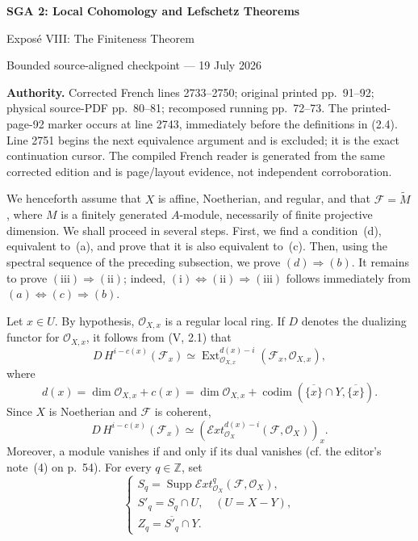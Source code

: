 \documentclass[10pt,a4paper]{article}
\newcommand{\cF}{\mathcal F}
\newcommand{\cO}{\mathcal O}
\newcommand{\sExt}{\mathcal E\!xt}
\newcommand{\Supp}{\operatorname{Supp}}
\newcommand{\codim}{\operatorname{codim}}
\begin{document}
\begin{center}
  {\Large\bfseries SGA 2: Local Cohomology and Lefschetz Theorems}\par\smallskip
  {\large Expos\'e VIII: The Finiteness Theorem}\par
  \small Bounded source-aligned checkpoint --- 19 July 2026
\end{center}
\noindent\colorbox{softgray}{\parbox{0.95\linewidth}{\footnotesize\textbf{Authority.}
Corrected French lines 2733--2750; original printed pp.~91--92; physical
source-PDF pp.~80--81; recomposed running pp.~72--73. The printed-page-92
marker occurs at line 2743, immediately before the definitions in (2.4).
Line 2751 begins the next equivalence argument and is excluded; it is the
exact continuation cursor. The compiled French reader is generated from the
same corrected edition and is page/layout evidence, not independent
corroboration.}}

\medskip
We henceforth assume that $X$ is affine, Noetherian, and regular, and that
$\cF=\widetilde M$, where $M$ is a finitely generated $A$-module, necessarily
of finite projective dimension. We shall proceed in several steps. First, we
find a condition~(d), equivalent to~(a), and prove that it is also equivalent
to~(c). Then, using the spectral sequence of the preceding subsection, we
prove $(d)\Rightarrow(b)$. It remains to prove
$(\mathrm{iii})\Rightarrow(\mathrm{ii})$; indeed,
$(\mathrm{i})\Leftrightarrow(\mathrm{ii})\Rightarrow(\mathrm{iii})$ follows
immediately from $(a)\Leftrightarrow(c)\Rightarrow(b)$.

Let $x\in U$. By hypothesis, $\cO_{X,x}$ is a regular local ring. If $D$
denotes the dualizing functor for $\cO_{X,x}$, it follows from (V, 2.1) that
\[
  D\,H^{i-c(x)}(\cF_x)\simeq
  \operatorname{Ext}^{d(x)-i}_{\cO_{X,x}}(\cF_x,\cO_{X,x}),
\]
where
\begin{equation}
  d(x)=\dim\cO_{X,x}+c(x)
      =\dim\cO_{X,x}
       +\codim(\overline{\{x\}}\cap Y,\overline{\{x\}}).
  \tag{2.2}
\end{equation}
Since $X$ is Noetherian and $\cF$ is coherent,
\begin{equation}
  D\,H^{i-c(x)}(\cF_x)\simeq
  (\sExt^{d(x)-i}_{\cO_X}(\cF,\cO_X))_x.
  \tag{2.3}
\end{equation}
Moreover, a module vanishes if and only if its dual vanishes (cf. the
editor's note~(4) on p.~54). For every $q\in\mathbb Z$, set
\begin{equation}
  \begin{cases}
    S_q=\Supp\sExt^q_{\cO_X}(\cF,\cO_X),\\
    S'_q=S_q\cap U,\quad (U=X-Y),\\
    Z_q=\overline{S'_q}\cap Y.
  \end{cases}
  \tag{2.4}
\end{equation}
\end{document}
